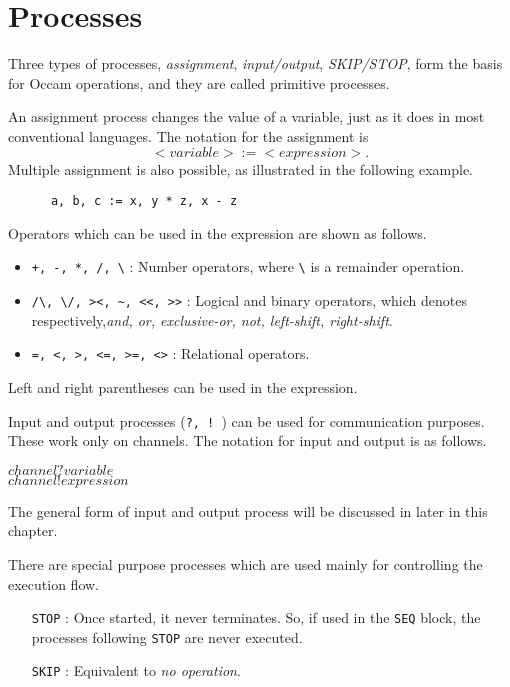 \section{Processes}


Three types of processes, {\em assignment}, {\em input/output}, {\em
SKIP/STOP}, form the basis for Occam operations, and they are called
primitive processes.  

An assignment process changes the value of a variable, just as it does
in most conventional languages.  The notation for the assignment is
\[
	<variable> := <expression>.
\]
Multiple assignment is also possible, as illustrated in the following
example.
\begin{lin}
\begin{verbatim}
      a, b, c := x, y * z, x - z
\end{verbatim}
\end{lin}
Operators which can be used in the expression are shown as follows.
\begin{itemize}
\item {\verb&+, -, *, /, \& } : Number operators, where {\verb+\+}
is a remainder operation.
\item {\verb&/\, \/, ><, ~, <<, >>&} : Logical and binary operators, which 
	denotes respectively,{\em and, or, exclusive-or, not, left-shift,
right-shift}.
\item {\verb&=, <, >, <=, >=, <>&} : Relational operators.
\end{itemize}
Left and right parentheses can be used in the expression.

\par
Input and output processes ({\tt ?, ! }) can be used for communication
purposes.  These work only on channels.  The notation for input and
output is as follows. 
\begin{center}
$channel ? variable$ \\
$channel ! expression$
\end{center}
The general form of input and output process will be discussed in
later in this chapter.

\par
There are special purpose processes which are used mainly for
controlling the execution flow.
\begin{lin}
\begin{itemize}
\item[{\tt STOP}] : Once started, it never terminates. So, if
	used in the {\tt SEQ} block, the processes following {\tt STOP} 
	are never executed. 
\item[{\tt SKIP}] : Equivalent to {\em no operation}.
\end{itemize}
\end{lin}

